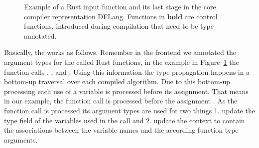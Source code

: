 \begin{figure}[H]
\centering
\tabskip=0pt
\caption{Example of a Rust input function and its last stage in the core compiler representation DFLang. Functions in $\mathbf{bold}$ are control functions, introduced during compilation that need to be type annotated.}
\label{fig:TypePropagationExample}
\end{figure}


Basically, the  works as follows. Remember in the frontend we annotated the argument types for the called Rust functions, in the example in Figure~\ref{fig:TypePropagationExample} the function calls , ,  and . Using this information the type propagation happens in a bottom-up traversal over each compiled algorithm. Due to this bottom-up processing each use of a variable is processed before its assignment. That means in our example, the function call 
 is processed before the assignment . As the function call is processed its argument types are used for two things 1. update the type field of the variables used in the call and 2. update the context to contain the associations between the variable names and the according function type arguments. \\

